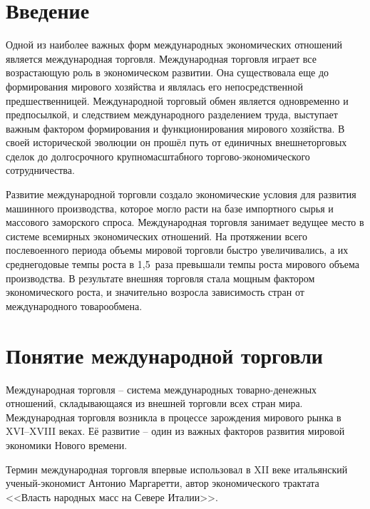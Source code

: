 \chapter*{Введение}

Одной из наиболее важных форм международных экономических отношений является
международная торговля. Международная торговля играет все возрастающую роль в
экономическом развитии. Она существовала еще до формирования мирового хозяйства
и являлась его непосредственной предшественницей. Международной торговый обмен
является одновременно и предпосылкой, и следствием международного разделением
труда, выступает важным фактором формирования и функционирования мирового
хозяйства. В своей исторической эволюции он прошёл путь от единичных
внешнеторговых сделок до долгосрочного крупномасштабного торгово-экономического
сотрудничества.


Развитие международной торговли создало экономические условия для развития
машинного производства, которое могло расти на базе импортного сырья и
массового заморского спроса. Международная торговля занимает ведущее место в
системе всемирных экономических отношений. На протяжении всего послевоенного
периода объемы мировой торговли быстро увеличивались, а их среднегодовые темпы
роста в 1,5~раза превышали темпы роста мирового объема производства. В
результате внешняя торговля стала мощным фактором экономического роста, и
значительно возросла зависимость стран от международного товарообмена.

\pagebreak %

\chapter{Понятие международной торговли}

Международная торговля -- система международных товарно-денежных отношений,
складывающаяся из внешней торговли всех стран мира. Международная торговля
возникла в процессе зарождения мирового рынка в XVI--XVIII веках. Её развитие
-- один из важных факторов развития мировой экономики Нового времени.

Термин международная торговля впервые использовал в XII веке итальянский
ученый-экономист Антонио Маргаретти, автор экономического трактата <<Власть
народных масс на Севере Италии>>.

